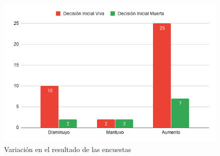 \begin{figure}[h]
    \centering
    \includegraphics[scale=.7]{imgs/resultado-encuesta-separado.png}
    \caption{Variación en el resultado de las encuestas}
    \label{fig:encuesta-resultados}
\end{figure}





